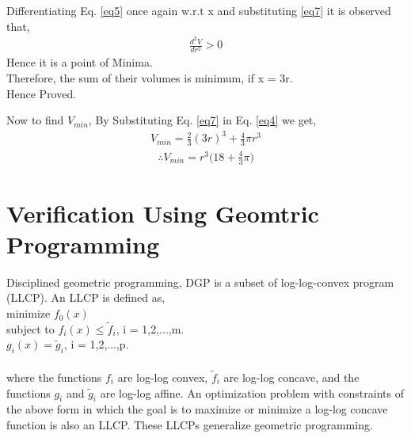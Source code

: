 \documentclass[journal,12pt,twocolumn]{IEEEtran}
\begin{document}
Differentiating Eq. \eqref{eq5} once again w.r.t x and substituting \eqref{eq7} it is observed that,
\begin{align}
\frac{d^2V}{dr^2} > 0
\end{align}
Hence it is a point of Minima.\\
\vspace{0.2cm}
Therefore, the sum of their volumes is minimum, if x = 3r.\\
\vspace{0.25cm}
\centering
Hence Proved.\\
\vspace{0.25cm}
\raggedright
Now to find $V_{min}$, By Substituting Eq. \eqref{eq7} in Eq. \eqref{eq4} we get,\\
\begin{align*}
V_{min} = \frac{2}{3} ( 3r )^3 + \frac{4}{3} \pi r^3
\end{align*} 
\begin{align*}
\therefore V_{min} = r^3 \Big( 18 + \frac{4}{3} \pi \Big)
\end{align*}
\section{Verification Using Geomtric Programming}
\vspace{0.25cm}
\raggedright
Disciplined geometric programming, DGP is a subset of log-log-convex program (LLCP). An LLCP is defined as,\\
\vspace{0.5cm}
\hspace{2cm} minimize $f_0(x)$\\
\vspace{0.2cm}
\hspace{2cm} subject to $f_i(x) \leq \tilde{f}_i$, i = 1,2,...,m.\\
\vspace{0.2cm}
\hspace{3.8cm} $g_i(x) = \tilde{g}_i$, i = 1,2,...,p.
\begin{align}
\label{eq8}
\end{align}

where the functions $f_i$
				are log-log convex, $\tilde{f}_i$
 are log-log concave, and the functions $g_i$
				and $\tilde{g}_i$
 are log-log affine. An optimization problem with constraints of the above form in which the goal is to maximize or minimize a log-log concave function is also an LLCP. These LLCPs generalize geometric programming.\\
\end{document}

